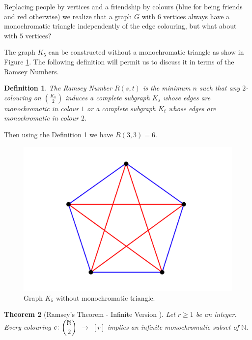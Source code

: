 \documentclass[12pt,twoside,a4paper,bibliography=totocnumbered]{book}
\numberwithin{equation}{section}
\newtheorem{theorem}             {Theorem}[section]
\newtheorem{definition}	[theorem] {Definition}
\theoremstyle{remark}
\begin{document}
Replacing people by vertices and a friendship by colours (blue for being friends and red otherwise) we realize that a graph $G$ with $6$ vertices always have a monochromatic triangle independently of the edge colouring, but what about with $5$ vertices?

The graph $K_5$ can be constructed without a monochromatic triangle as show in Figure \ref{fig:K5}. The following definition will permit us to discuss it in terms of the Ramsey Numbers.

\begin{definition}\label{def:RamseyNumbers} 
The Ramsey Number $R(s,t)$ is the minimum $n$ such that any $2$-colouring on $\binom{K_n}{2}$ induces a complete subgraph $K_s$ whose edges are monochromatic in colour $1$ or a complete subgraph $K_t$ whose edges are monochromatic in colour $2$.
\end{definition}

Then using the Definition \ref{def:RamseyNumbers} we have $R(3,3) = 6$.

\begin{figure}[H]
     \centering
     \includegraphics[scale=1]{Figuras/K5-sem-triangulo.jpg}
     \caption{Graph $K_5$ without monochromatic triangle.}
     \label{fig:K5}
\end{figure}

\begin{theorem}[{Ramsey's Theorem - Infinite Version \cite{Ra29}}]\label{thm:RamseyTheorem}
Let $r \geq 1$ be an integer. Every colouring $c\colon \dbinom{\mathbb{N}}{2}$ $\rightarrow$ $[r]$ implies an infinite monochromatic subset of $\mathbb{N}$.
\end{theorem}
\end{document}
